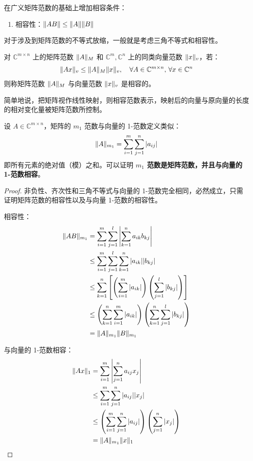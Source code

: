 \begin{definition}[矩阵范数]
在广义矩阵范数的基础上增加相容条件：
\begin{enumerate}[resume=matrix-norm]
    \item 相容性：$\Vert AB\Vert\leq\Vert A\Vert\Vert B\Vert$
\end{enumerate}
\end{definition}

\begin{remark}
对于涉及到矩阵范数的不等式放缩，一般就是考虑三角不等式和相容性。
\end{remark}

\begin{definition}[相容范数]
对 $\mathbb C^{m\times n}$ 上的矩阵范数 $\Vert A\Vert_M$ 和 $\mathbb C^m,\mathbb C^n$ 上的同类向量范数 $\Vert x\Vert_v$，若：
\[
    \Vert Ax\Vert_v\leq \Vert A\Vert_M\Vert x\Vert_v,\quad \forall A\in\mathbb C^{m\times n},\,\forall x\in\mathbb C^n
\]
则称矩阵范数 $\Vert A\Vert_M$ 与向量范数 $\Vert x\Vert_v$ 是相容的。
\end{definition}

\begin{remark}
简单地说，把矩阵视作线性映射，则相容范数表示，映射后的向量与原向量的长度的相对变化量被矩阵范数所控制。
\end{remark}

\begin{example}[$m_1$ 范数]
设 $A\in\mathbb C^{m\times n}$，矩阵的 $m_1$ 范数与向量的 1-范数定义类似：
\[
    \Vert A\Vert_{m_1}=\sum_{i=1}^m\sum_{j=1}^n|a_{ij}|
\]
即所有元素的绝对值（模）之和。可以证明 \textbf{$m_1$ 范数是矩阵范数，并且与向量的 1-范数相容}。
\end{example}

\begin{proof}
非负性、齐次性和三角不等式与向量的 1-范数完全相同，必然成立，只需证明矩阵范数的相容性以及与向量 1-范数的相容性。

相容性：
\begin{align*}
    \Vert AB\Vert_{m_1}&=\sum_{i=1}^m\sum_{j=1}^l\left|\sum_{k=1}^na_{ik}b_{kj}\right|\\
    &\leq\sum_{i=1}^m\sum_{j=1}^l\sum_{k=1}^n|a_{ik}||b_{kj}|\\
    &\leq\sum_{k=1}^n\left[\left(\sum_{i=1}^m|a_{ik}|\right)\left(\sum_{j=1}^l|b_{kj}|\right)\right]\\
    &\leq\left(\sum_{k=1}^n\sum_{i=1}^m|a_{ik}|\right)\left(\sum_{k=1}^n\sum_{j=1}^l|b_{kj}|\right)\\
    &=\Vert A\Vert_{m_1}\Vert B\Vert_{m_1}
\end{align*}

与向量的 1-范数相容：
\begin{align*}
    \Vert Ax\Vert_1&=\sum_{i=1}^m\left|\sum_{j=1}^na_{ij}x_j\right|\\
    &\leq\sum_{i=1}^m\sum_{j=1}^n|a_{ij}||x_j|\\
    &\leq\left(\sum_{i=1}^m\sum_{j=1}^n|a_{ij}|\right)\left(\sum_{j=1}^n|x_j|\right)\\
    &=\Vert A\Vert_{m_1}\Vert x\Vert_1
\end{align*}    
\end{proof}

